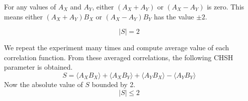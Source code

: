 \documentclass[17pt,a4paper]{extarticle}
\begin{document}
For any values of $A_X$ and $A_Y$, either $(A_X+A_Y)$ or $(A_X-A_Y)$ is zero. This means either $(A_X+A_Y)B_X$ or $(A_X-A_Y)B_Y$ has the value $\pm2$.

\begin{equation}
|S|=2
\end{equation}

We repeat the experiment many times and compute average value of each correlation function. From these averaged correlations, the following CHSH parameter is obtained.
\setcounter{equation}{0}
\begin{equation}
S=\langle A_XB_X \rangle+\langle A_XB_Y \rangle+\langle A_YB_X\rangle -\langle A_YB_Y \rangle
\end{equation}
Now the absolute value of $S$ bounded by 2.
\begin{equation}
|S|\leq2
\end{equation}
\end{document}
